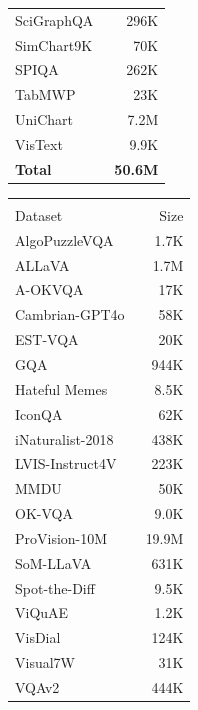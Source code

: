 \begin{table}[!h]
\begin{minipage}[t]{0.245\textwidth}
\begin{tabular}{lr}
SciGraphQA~\cite{li2023scigraphqa} & 296K \\
SimChart9K~\cite{xia2023structchart} & 70K \\
SPIQA~\cite{pramanick2024spiqa} & 262K \\
TabMWP~\cite{lu2023tabmwp} & 23K \\
UniChart~\cite{masry2023unichart} & 7.2M \\
VisText~\cite{tang2023vistext} & 9.9K \\
\midrule
\textbf{Total} & \textbf{50.6M} \\
\bottomrule
\end{tabular}
\end{minipage}
\hfill
\begin{minipage}[t]{0.245\textwidth}
\centering
\begin{tabular}{lr}
\toprule
\rowcolor{instructcolor}\multicolumn{2}{l}{\textit{General QA}} \\
Dataset & Size \\
\midrule
AlgoPuzzleVQA~\cite{ghosal2024algopuzzlevqa} & 1.7K \\
ALLaVA~\cite{chen2024allava} & 1.7M \\
A-OKVQA~\cite{schwenk2022aokvqa} & 17K \\
Cambrian-GPT4o~\cite{tong2024cambrian} & 58K \\
EST-VQA~\cite{wang2020estvqa} & 20K \\
GQA~\cite{hudson2019gqa} & 944K \\
Hateful Memes~\cite{kiela2020hateful} & 8.5K \\
IconQA~\cite{lu2021iconqa} & 62K \\
iNaturalist-2018~\cite{vanhorn2018inaturalist} & 438K \\
LVIS-Instruct4V~\cite{wang2023lvisinstruct4v} & 223K \\
MMDU~\cite{liu2024mmdu} & 50K \\
OK-VQA~\cite{marino2019okvqa} & 9.0K \\
ProVision-10M~\cite{zhang2024provision} & 19.9M \\
SoM-LLaVA~\cite{yan2024listitems} & 631K \\
Spot-the-Diff~\cite{jhamtani2018spotthediff} & 9.5K \\
ViQuAE~\cite{lerner2022viquae} & 1.2K \\
VisDial~\cite{das2017visdial} & 124K \\
Visual7W~\cite{zhu2016visual7w} & 31K \\
VQAv2~\cite{goyal2017making} & 444K \\

\end{tabular}
\end{minipage}
\end{table}
